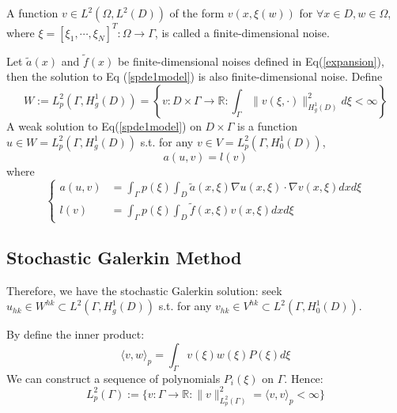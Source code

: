 \begin{definition}
    A function $v\in L^2(\Omega, L^2(D))$ of the form $v(x, \xi(w))$ for $\forall x\in D,w\in \Omega$, where $\xi = [\xi_1, \cdots, \xi_{N}]^T:\Omega\to \Gamma$, is called a finite-dimensional noise.
\end{definition}

\begin{definition}
    Let $\tilde{a}(x)$ and $\tilde{f}(x)$ be finite-dimensional noises defined in Eq(\ref{expansion}), then the solution to Eq (\ref{spde1model}) is also finite-dimensional noise. 
    Define
    \begin{equation}
        W:=L^2_p(\Gamma, H^1_g(D)) = \left\{v:D\times \Gamma\to \mathbb{R}: \int_\Gamma \|v(\xi, \cdot)\|_{H^1_g(D)}^2d\xi<\infty\right\}
    \end{equation}
    A weak solution to Eq(\ref{spde1model}) on $D\times \Gamma$ is a function $u\in W=L^2_p(\Gamma, H^1_g(D))$ s.t. for any $v\in V=L^2_p(\Gamma, H^1_0(D))$,
    \begin{equation}
        a(u, v) = l(v)\label{weakfd}
    \end{equation}
    where
    \begin{equation}\left\{
        \begin{aligned}
            a(u, v) &= \int_\Gamma p(\xi)\int_D \tilde{a}(x, \xi)\nabla u(x, \xi)\cdot \nabla v(x, \xi)dxd\xi\\
            l(v) &= \int_\Gamma p(\xi)\int_D \tilde{f}(x, \xi)v(x, \xi)dxd\xi
        \end{aligned}\right.
    \end{equation}
\end{definition}
\subsection{Stochastic Galerkin Method}
Therefore, we have the stochastic Galerkin solution: seek $u_{hk}\in W^{hk}\subset L^2(\Gamma, H^1_g(D))$ s.t. for any $v_{hk}\in V^{hk}\subset L^2(\Gamma, H^1_0(D))$.

By define the inner product:
\begin{equation}
    \langle v, w\rangle_{p} = \int_\Gamma v(\xi)w(\xi)P(\xi)d\xi
\end{equation}
We can construct a sequence of polynomials $P_i(\xi)$ on $\Gamma$. Hence:
\begin{equation}
    L^2_p(\Gamma):=\{v:\Gamma\to \mathbb{R}: \|v\|^2_{L^2_p(\Gamma)} = \langle v, v\rangle_p<\infty\}
\end{equation}

